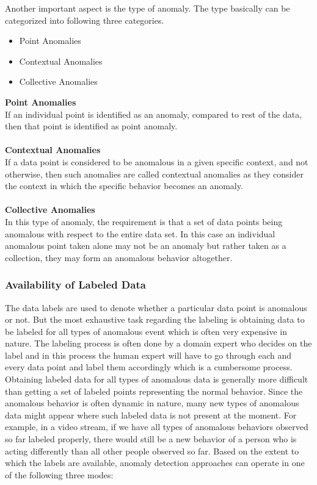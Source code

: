 \documentclass[a4paper,12pt]{report}
\begin{document}
Another important aspect is the type of anomaly. The type basically can be categorized into following three categories. 
\begin{itemize}
    \item Point Anomalies 
	\item Contextual Anomalies
	\item Collective Anomalies
\end{itemize}
\textbf{Point Anomalies}\\
If an individual point is identified as an anomaly, compared to rest of the data, then that point is identified as point anomaly.  
\\\\
\textbf{Contextual Anomalies}\\
If a data point is considered to be anomalous in a given specific context, and not otherwise, then such anomalies are called contextual anomalies as they consider the context in which the specific behavior becomes an anomaly. 
\\\\
\textbf{Collective Anomalies}\\
In this type of anomaly, the requirement is that a set of data points being anomalous with respect to the entire data set. In this case an individual anomalous point taken alone may not be an anomaly but rather taken as a collection, they may form an anomalous behavior altogether.

\subsubsection{Availability of Labeled Data }

The data labels are used to denote whether a particular data point is anomalous or not. But the most exhaustive task regarding the labeling is obtaining data to be labeled for all types of anomalous event which is often very expensive in nature. The labeling process is often done by a domain expert who decides on the label and in this process the human expert will have to go through each and every data point and label them accordingly which is a cumbersome process. Obtaining labeled data for all types of anomalous data is generally more difficult than getting a set of labeled points representing the normal behavior. Since the anomalous behavior is often dynamic in nature, many new types of anomalous data might appear where such labeled data is not present at the moment. For example, in a video stream, if we have all types of anomalous behaviors observed so far labeled properly, there would still be a new behavior of a person who is acting differently than all other people observed so far. 
Based on the extent to which the labels are available, anomaly detection approaches can operate in one of the following three modes:
\end{document}
